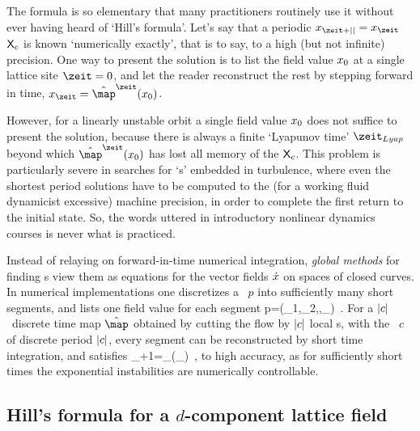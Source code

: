 The formula is so elementary that many practitioners routinely use it
without ever having heard of `Hill's formula'.
Let's say that a periodic $\ssp_{\zeit+\cl{}}=\ssp_\zeit$ {\lattstate}
$\mathsf{X}_c$ is known `numerically exactly', that is to say, to a high (but not
infinite) precision. One way to present the solution is to list the field
value $x_0$ at a single lattice site $\zeit=0$, and let the reader
reconstruct the rest by stepping forward in time,
$\ssp_{\zeit}=\hat{\map}^\zeit(\ssp_0)$.

However, for a linearly unstable orbit a single  field value $x_0$
does not suffice to present the solution, because there is always a finite
`Lyapunov time' $\zeit_{Lyap}$  beyond which $\hat{\map}^\zeit(\ssp_0)$
has lost all memory of the {\lattstate} $\mathsf{X}_c$. This problem is particularly
severe in searches for {`\ecs s'} embedded in turbulence, where even the
shortest period solutions have to be computed to the (for a working fluid
dynamicist excessive) machine
precision, in order to complete the
first return to the initial state. So, the words uttered in introductory
nonlinear dynamics courses is never what is practiced.

Instead of relaying on for\-ward-in-time numerical integration,
\emph{global methods} for finding {\po}s view them
as equations for the vector fields $\dot{x}$ on spaces of closed
curves. In numerical implementations one discretizes a \po\  $p$ into
sufficiently many short
segments, and lists one
field value for each segment
\beq
p=(\ssp_1,\ssp_2,\cdots,\ssp_)
\,.
For a ${|c|}$\dmn\ discrete time map $\hat{\map}$ obtained by cutting the flow by
${|c|}$ local {\PoincSec s}, with the \po\ $c$ of discrete period ${|c|}$,
every segment can be reconstructed by short time integration, and
satisfies
\beq
\ssp_{\zeit+1}=\hat{\map}_\zeit(\ssp_\zeit)
\,,
to high accuracy, as for sufficiently short times the exponential
instabilities are numerically controllable.

\subsection{Hill's formula for a $d$-component lattice field}
\label{s:LC21notHill}   %

